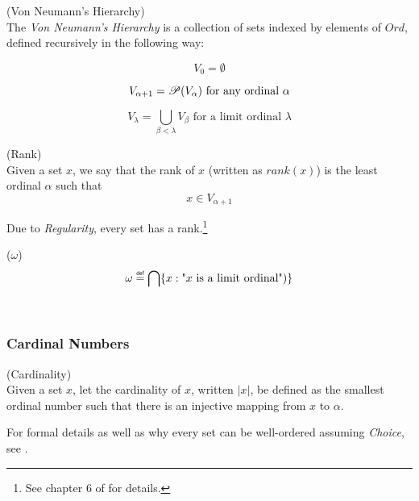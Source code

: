 \begin{definition}{(Von Neumann's Hierarchy)}\label{def:von_neumann}\\
The \emph{Von Neumann's Hierarchy} is a collection of sets indexed by elements of $Ord$, defined recursively in the following way:
\bce[(i)]
\item 
\begin{equation}
V_0 = \emptyset
\end{equation}
\item 
\begin{equation}
V_{\alpha+1} = \mathscr{P} (V_\alpha)\mbox{ for any ordinal $\alpha$}
\end{equation}
\item
\begin{equation} 
V_\lambda = \bigcup_{\beta < \lambda} V_\beta \mbox{ for a limit ordinal $\lambda$}
\end{equation}
\ece
\end{definition}

\begin{definition}{(Rank)}\label{def:rank}\\
Given a set $x$, we say that the rank of $x$ (written as $rank(x)$) is the least ordinal $\alpha$ such that
\begin{equation}
x \in V_{\alpha+1}
\end{equation}
\end{definition}
Due to \emph{Regularity}, every set has a rank.\footnote{See chapter 6 of \cite{JechBook} for details.}

\begin{definition}{($\omega$)}\\
\begin{equation}
\omega \defeq \bigcap\{x : \mbox{"$x$ is a limit ordinal"})\}
\end{equation}
\end{definition}

\

\subsubsection{Cardinal Numbers}

\begin{definition}{(Cardinality)}\\
Given a set $x$, let the cardinality of $x$, written $|x|$, be defined as the smallest ordinal number such that there is an injective mapping from $x$ to $\alpha$.
\end{definition}
For formal details as well as why every set can be well-ordered assuming \emph{Choice}, see \cite{JechBook}.

